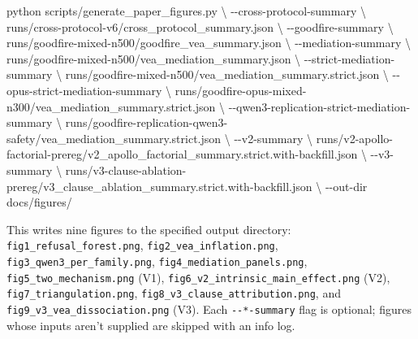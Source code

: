 \documentclass[
]{article}
\newenvironment{Shaded}{}{}
\newcommand{\AttributeTok}[1]{\textcolor[rgb]{0.49,0.56,0.16}{#1}}
\newcommand{\DataTypeTok}[1]{\textcolor[rgb]{0.56,0.13,0.00}{#1}}
\newcommand{\ExtensionTok}[1]{#1}
\newcommand{\NormalTok}[1]{#1}
\begin{document}
\begin{Shaded}
\begin{Highlighting}[]
\ExtensionTok{python}\NormalTok{ scripts/generate\_paper\_figures.py }\DataTypeTok{\textbackslash{}}
  \AttributeTok{{-}{-}cross{-}protocol{-}summary} \DataTypeTok{\textbackslash{}}
\NormalTok{      runs/cross{-}protocol{-}v6/cross\_protocol\_summary.json }\DataTypeTok{\textbackslash{}}
  \AttributeTok{{-}{-}goodfire{-}summary} \DataTypeTok{\textbackslash{}}
\NormalTok{      runs/goodfire{-}mixed{-}n500/goodfire\_vea\_summary.json }\DataTypeTok{\textbackslash{}}
  \AttributeTok{{-}{-}mediation{-}summary} \DataTypeTok{\textbackslash{}}
\NormalTok{      runs/goodfire{-}mixed{-}n500/vea\_mediation\_summary.json }\DataTypeTok{\textbackslash{}}
  \AttributeTok{{-}{-}strict{-}mediation{-}summary} \DataTypeTok{\textbackslash{}}
\NormalTok{      runs/goodfire{-}mixed{-}n500/vea\_mediation\_summary.strict.json }\DataTypeTok{\textbackslash{}}
  \AttributeTok{{-}{-}opus{-}strict{-}mediation{-}summary} \DataTypeTok{\textbackslash{}}
\NormalTok{      runs/goodfire{-}opus{-}mixed{-}n300/vea\_mediation\_summary.strict.json }\DataTypeTok{\textbackslash{}}
  \AttributeTok{{-}{-}qwen3{-}replication{-}strict{-}mediation{-}summary} \DataTypeTok{\textbackslash{}}
\NormalTok{      runs/goodfire{-}replication{-}qwen3{-}safety/vea\_mediation\_summary.strict.json }\DataTypeTok{\textbackslash{}}
  \AttributeTok{{-}{-}v2{-}summary} \DataTypeTok{\textbackslash{}}
\NormalTok{      runs/v2{-}apollo{-}factorial{-}prereg/v2\_apollo\_factorial\_summary.strict.with{-}backfill.json }\DataTypeTok{\textbackslash{}}
  \AttributeTok{{-}{-}v3{-}summary} \DataTypeTok{\textbackslash{}}
\NormalTok{      runs/v3{-}clause{-}ablation{-}prereg/v3\_clause\_ablation\_summary.strict.with{-}backfill.json }\DataTypeTok{\textbackslash{}}
  \AttributeTok{{-}{-}out{-}dir}\NormalTok{ docs/figures/}
\end{Highlighting}
\end{Shaded}

This writes nine figures to the specified output directory:
\texttt{fig1\_refusal\_forest.png}, \texttt{fig2\_vea\_inflation.png},
\texttt{fig3\_qwen3\_per\_family.png},
\texttt{fig4\_mediation\_panels.png}, \texttt{fig5\_two\_mechanism.png}
(V1), \texttt{fig6\_v2\_intrinsic\_main\_effect.png} (V2),
\texttt{fig7\_triangulation.png},
\texttt{fig8\_v3\_clause\_attribution.png}, and
\texttt{fig9\_v3\_vea\_dissociation.png} (V3). Each
\texttt{-\/-*-summary} flag is optional; figures whose inputs aren't
supplied are skipped with an info log.
\end{document}
